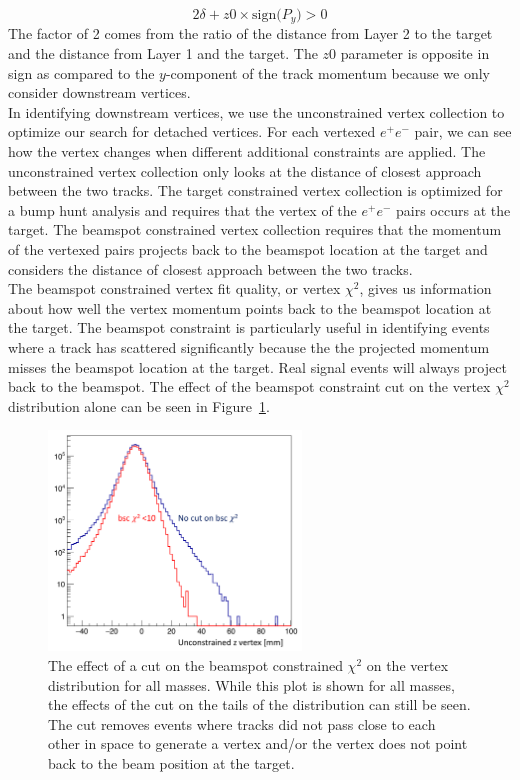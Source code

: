 \begin{equation}
\label{eq:isolationl1}
2\delta+z0\times\textrm{sign($P_y$)}>0
\end{equation}
The factor of 2 comes from the ratio of the distance from Layer 2 to the target and the distance from Layer 1 and the target. The $z0$ parameter is opposite in sign as compared to the $y$-component of the track momentum because we only consider downstream vertices. \\
\indent In identifying downstream vertices, we use the unconstrained vertex collection to optimize our search for detached vertices. For each vertexed $e^+e^-$ pair, we can see how the vertex changes when different additional constraints are applied. The unconstrained vertex collection only looks at the distance of closest approach between the two tracks. The target constrained vertex collection is optimized for a bump hunt analysis and requires that the vertex of the $e^+e^-$ pairs occurs at the target. The beamspot constrained vertex collection requires that the momentum of the vertexed pairs projects back to the beamspot location at the target and considers the distance of closest approach between the two tracks.\\ 
\indent The beamspot constrained vertex fit quality, or vertex $\chi^2$, gives us information about how well the vertex momentum points back to the beamspot location at the target. The beamspot constraint is particularly useful in identifying events where a track has scattered significantly because the the projected momentum misses the beamspot location at the target. Real signal events will always project back to the beamspot. The effect of the beamspot constraint cut on the vertex  $\chi^2$ distribution alone can be seen in Figure~\ref{fig:bsccut}.

\begin{figure}[htb]
  \centering
      \includegraphics[width=0.6\textwidth]{pics/searching/bscCut.png}
  \caption[Cut on beam spot constrained vertex $\chi^2$]{The effect of a cut on the beamspot constrained $\chi^2$ on the vertex distribution for all masses. While this plot is shown for all masses, the effects of the cut on the tails of the distribution can still be seen. The cut removes events where tracks did not pass close to each other in space to generate a vertex and/or the vertex does not point back to the beam position at the target.}
  \label{fig:bsccut}
\end{figure} 

